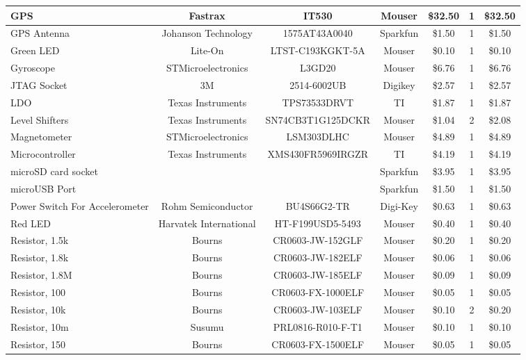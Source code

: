 \begin{landscape}
{\begin{center}
\begin{longtable}{|p{1.5in}|c|c|c|c|c|c|}
    GPS   & Fastrax & IT530 & Mouser & \$32.50 & 1     & \$32.50 \\ \hline
    GPS Antenna & Johanson Technology & 1575AT43A0040 & Sparkfun & \$1.50 & 1     & \$1.50 \\ \hline
    Green LED & Lite-On & LTST-C193KGKT-5A & Mouser & \$0.10 & 1     & \$0.10 \\ \hline
    Gyroscope & STMicroelectronics & L3GD20 & Mouser & \$6.76 & 1     & \$6.76 \\ \hline
    JTAG Socket & 3M    & 2514-6002UB & Digikey & \$2.57 & 1     & \$2.57 \\ \hline
    LDO   & Texas Instruments & TPS73533DRVT & TI    & \$1.87 & 1     & \$1.87 \\ \hline
    Level Shifters & Texas Instruments & SN74CB3T1G125DCKR & Mouser & \$1.04 & 2     & \$2.08 \\ \hline
    Magnetometer & STMicroelectronics & LSM303DLHC & Mouser & \$4.89 & 1     & \$4.89 \\ \hline
    Microcontroller & Texas Instruments & XMS430FR5969IRGZR & TI    & \$4.19 & 1     & \$4.19 \\ \hline
    microSD card socket &       &       & Sparkfun & \$3.95 & 1     & \$3.95 \\ \hline
    microUSB Port &       &       & Sparkfun & \$1.50 & 1     & \$1.50 \\ \hline
    Power Switch For Accelerometer & Rohm Semiconductor & BU4S66G2-TR & Digi-Key & \$0.63 & 1     & \$0.63 \\ \hline
    Red LED & Harvatek International & HT-F199USD5-5493 & Mouser & \$0.40 & 1     & \$0.40 \\ \hline
    Resistor, 1.5k & Bourns & CR0603-JW-152GLF & Mouser & \$0.20 & 1     & \$0.20 \\ \hline
    Resistor, 1.8k & Bourns & CR0603-JW-182ELF & Mouser & \$0.06 & 1     & \$0.06 \\ \hline
    Resistor, 1.8M & Bourns & CR0603-JW-185ELF & Mouser & \$0.09 & 1     & \$0.09 \\ \hline
    Resistor, 100 & Bourns & CR0603-FX-1000ELF & Mouser & \$0.05 & 1     & \$0.05 \\ \hline
    Resistor, 10k & Bourns & CR0603-JW-103ELF & Mouser & \$0.10 & 2     & \$0.20 \\ \hline
    Resistor, 10m & Susumu & PRL0816-R010-F-T1 & Mouser & \$0.10 & 1     & \$0.10 \\ \hline
    Resistor, 150 & Bourns & CR0603-FX-1500ELF & Mouser & \$0.05 & 1     & \$0.05 \\ \hline

\end{longtable}
\end{center}}
\end{landscape}
